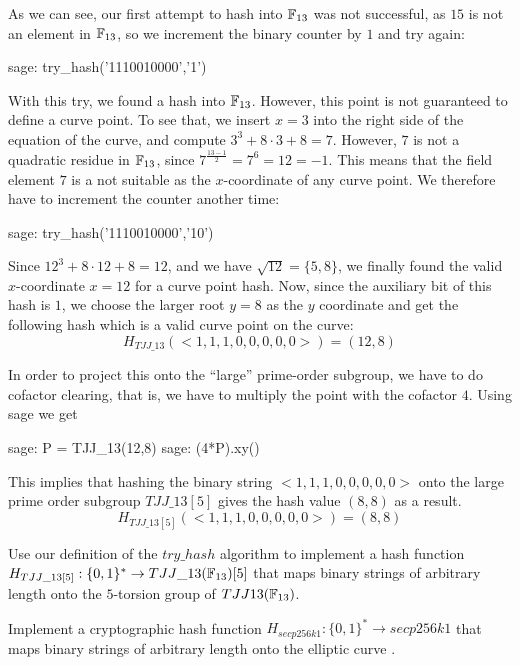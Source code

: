 \begin{example}
As we can see, our first attempt to hash into $\mathbb{F}_{13}$ was not successful, as $15$ is not an element in $\mathbb{F}_{13}$, so we increment the binary counter by $1$ and try again: 
\begin{sagecommandline}
sage: try_hash('1110010000','1')
\end{sagecommandline}

With this try, we found a hash into $\mathbb{F}_{13}$. However, this point is not guaranteed to define a curve point. To see that, we insert $x=3$ into the right side of the  equation of the  curve, and compute $3^3 + 8\cdot 3 + 8 = 7$. However, $7$ is not a quadratic residue in $\mathbb{F}_{13}$, since $7^{\frac{13-1}{2}}=7^6=12=-1$. This means that the field element $7$ is a not suitable as the $x$-coordinate of any curve point. We therefore have to increment the counter another time: 
\begin{sagecommandline}
sage: try_hash('1110010000','10')
\end{sagecommandline}
Since $12^3 + 8\cdot 12 + 8 = 12$, and we have $\sqrt{12} = \{5, 8\}$, we finally found the valid $x$-coordinate $x=12$ for a curve point hash. Now, since the auxiliary bit of this hash is $1$, we choose the larger root $y=8$ as the $y$ coordinate and get the following hash which is a valid curve point on the  curve:
$$
H_{TJJ\_13}(<1,1,1,0,0,0,0,0>) = (12,8)
$$

In order to project this onto the ``large'' prime-order subgroup, we have to do cofactor clearing, that is, we have to multiply the point with the cofactor $4$. Using sage we get
\begin{sagecommandline}
sage: P = TJJ_13(12,8)
sage: (4*P).xy()
\end{sagecommandline}

This implies that hashing the binary string $<1,1,1,0,0,0,0,0>$ onto the large prime order subgroup $TJJ\_13[5]$ gives the hash value $(8,8)$ as a result. 
$$
H_{TJJ\_13[5]}(<1,1,1,0,0,0,0,0>) = (8,8)
$$
\end{example}
\begin{exercise}
Use our definition of the $try\_hash$ algorithm to implement a hash function $H_{TJJ\_13[5]} : \{0,1\}^*\to TJJ\_13(\mathbb{F}_{13})[5]$ that maps binary strings of arbitrary length onto the $5$-torsion group of $TJJ13(\mathbb{F}_{13})$. 
\end{exercise}
\begin{exercise}
Implement a cryptographic hash function $H_{secp256k1} : \{0,1\}^*\to secp256k1$ that maps binary strings of arbitrary length onto the elliptic curve . 
\end{exercise}